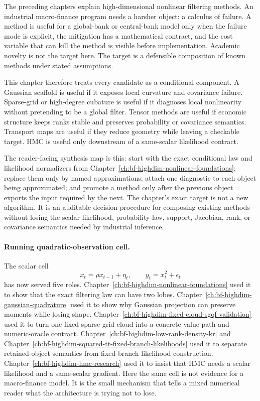 The preceding chapters explain high-dimensional nonlinear filtering methods.
An industrial macro-finance program needs a harsher object: a calculus of
failure.  A method is useful for a global-bank or central-bank model only when
the failure mode is explicit, the mitigation has a mathematical contract, and
the cost variable that can kill the method is visible before implementation.
Academic novelty is not the target here.  The target is a defensible
composition of known methods under stated assumptions.

This chapter therefore treats every candidate as a conditional component.  A
Gaussian scaffold is useful if it exposes local curvature and covariance
failure.  Sparse-grid or high-degree cubature is useful if it diagnoses local
nonlinearity without pretending to be a global filter.  Tensor methods are
useful if economic structure keeps ranks stable and preserves probability or
covariance semantics.  Transport maps are useful if they reduce geometry while
leaving a checkable target.  HMC is useful only downstream of a same-scalar
likelihood contract.

The reader-facing synthesis map is this: start with the exact conditional law
and likelihood normalizers from Chapter~\ref{ch:bf-highdim-nonlinear-foundations};
replace them only by named approximations; attach one diagnostic to each object
being approximated; and promote a method only after the previous object exports
the input required by the next.  The chapter's exact target is not a new
algorithm.  It is an auditable decision procedure for composing existing methods
without losing the scalar likelihood, probability-law, support, Jacobian, rank,
or covariance semantics needed by industrial inference.

\paragraph{Running quadratic-observation cell.}
The scalar cell
\[
  x_t=\rho x_{t-1}+\eta_t,\qquad y_t=x_t^2+\epsilon_t
\]
has now served five roles.  Chapter~\ref{ch:bf-highdim-nonlinear-foundations}
used it to show that the exact filtering law can have two lobes.
Chapter~\ref{ch:bf-highdim-gaussian-quadrature} used it to show why Gaussian
projection can preserve moments while losing shape.  Chapter~\ref{ch:bf-highdim-fixed-cloud-sgqf-validation}
used it to turn one fixed sparse-grid cloud into a concrete value-path and
numeric-oracle contract.  Chapter~\ref{ch:bf-highdim-low-rank-density-kr} and
Chapter~\ref{ch:bf-highdim-squared-tt-fixed-branch-likelihoods} used it to
separate retained-object semantics from fixed-branch likelihood construction.
Chapter~\ref{ch:bf-highdim-hmc-research} used it to insist that HMC needs a
scalar likelihood and a same-scalar gradient.  Here the same cell is not
evidence for a macro-finance model.  It is the small mechanism that tells a
mixed numerical reader what the architecture is trying not to lose.

